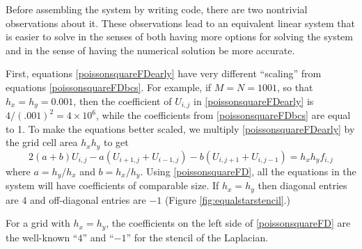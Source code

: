 \medskip
Before assembling the system by writing \PETSc code, there are two nontrivial observations about it.  These observations lead to an equivalent linear system that is easier to solve in the senses of both having more options for solving the system and in the sense of having the numerical solution be more accurate.

First, equations \eqref{poissonsquareFDearly} have very different ``scaling'' from equations \eqref{poissonsquareFDbcs}.  For example, if $M=N=1001$, so that $h_x=h_y=0.001$, then the coefficient of $U_{i,j}$ in \eqref{poissonsquareFDearly} is $4/(.001)^2 = 4 \times 10^6$, while the coefficients from \eqref{poissonsquareFDbcs} are equal to 1.  To make the equations better scaled, we multiply \eqref{poissonsquareFDearly} by the grid cell area $h_x h_y$ to get
\begin{equation}
2 (a + b) U_{i,j} - a \left(U_{i+1,j} + U_{i-1,j}\right) - b \left(U_{i,j+1} + U_{i,j-1}\right) = h_x h_y f_{i,j} \label{poissonsquareFD}
\end{equation}
where $a=h_y/h_x$ and $b=h_x/h_y$.  Using \eqref{poissonsquareFD}, all the equations in the system will have coefficients of comparable size.  If $h_x=h_y$ then diagonal entries are $4$ and off-diagonal entries are $-1$ (Figure \ref{fig:equalstarstencil}.)

\begin{marginfigure}
\caption{For a grid with $h_x=h_y$, the coefficients on the left side of \eqref{poissonsquareFD} are the well-known ``$4$'' and ``$-1$'' for the stencil of the Laplacian.}
\label{fig:equalstarstencil}
\end{marginfigure}


